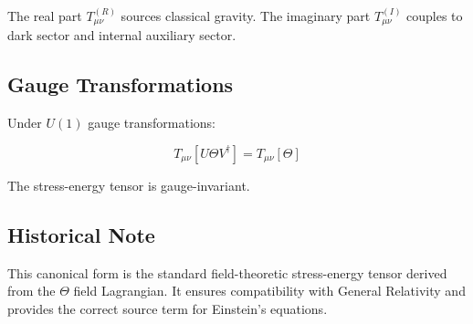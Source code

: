 The real part $T_{\mu\nu}^{(R)}$ sources classical gravity. The imaginary part $T_{\mu\nu}^{(I)}$ couples to dark sector and internal auxiliary sector.

\subsection{Gauge Transformations}

Under $U(1)$ gauge transformations:

\begin{equation}
T_{\mu\nu}[U\Theta V^\dagger] = T_{\mu\nu}[\Theta]
\end{equation}

The stress-energy tensor is gauge-invariant.

\subsection{Historical Note}

This canonical form is the standard field-theoretic stress-energy tensor derived from the $\Theta$ field Lagrangian. It ensures compatibility with General Relativity and provides the correct source term for Einstein's equations.

